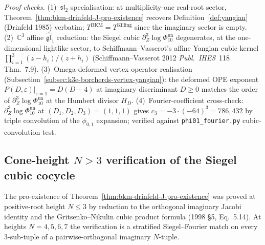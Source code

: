 \noindent\textit{Proof checks.}
(1)~$\mathfrak{sl}_2$ specialisation: at multiplicity-one real-root sector,
Theorem~\ref{thm:bkm-drinfeld-J-pro-existence} recovers
Definition~\ref{def:yangian} (Drinfeld 1985) verbatim;
$T^{\mathrm{BKM}} = T^{\mathrm{Killing}}$ since the imaginary sector is empty.
(2)~$\mathbb C^3$ affine $\widehat{\mathfrak{gl}}_1$ reduction: the Siegel
cubic \(\partial^3_Z\log\Phi_{10}^{\mathrm{un}}\) degenerates, at the one-dimensional
lightlike sector, to Schiffmann--Vasserot's affine Yangian cubic kernel
$\prod_{i=1}^{3}(z-h_i)/(z+h_i)$ (Schiffmann--Vasserot 2012
\emph{Publ.\ IHES}~118 Thm.~7.9).
(3)~Omega-deformed vertex operator realisation
(Subsection~\ref{subsec:k3e-borcherds-vertex-yangian}): the deformed OPE
exponent $P(D,\varepsilon)|_{\varepsilon=1} = D(D-4)$ at imaginary
discriminant $D\ge 0$ matches the order of \(\partial^3_Z\log\Phi_{10}^{\mathrm{un}}\)
at the Humbert divisor $H_D$.
(4)~Fourier-coefficient cross-check: \(\partial^3_Z\log\Phi_{10}^{\mathrm{un}}\) at
$(D_1,D_2,D_3) = (1,1,1)$ gives $c_3 = -3\cdot(-64)^3 = 786{,}432$
by triple convolution of the $\phi_{0,1}$ expansion; verified against
\texttt{phi01\_fourier.py} cubic-convolution test.

\subsection{Cone-height \texorpdfstring{$N>3$}{N>3} verification of the Siegel cubic cocycle}
\label{subsec:k3ebkm-drinfeld-J-height-N-verification}

The pro-existence of Theorem~\ref{thm:bkm-drinfeld-J-pro-existence}
was proved at positive-root height $N\le 3$ by reduction to the
orthogonal imaginary Jacobi identity and the Gritsenko--Nikulin cubic
product formula (1998 \S5, Eq.~5.14). At heights $N=4,5,6,7$ the
verification is a stratified Siegel--Fourier match on every
$3$-sub-tuple of a pairwise-orthogonal imaginary $N$-tuple.

